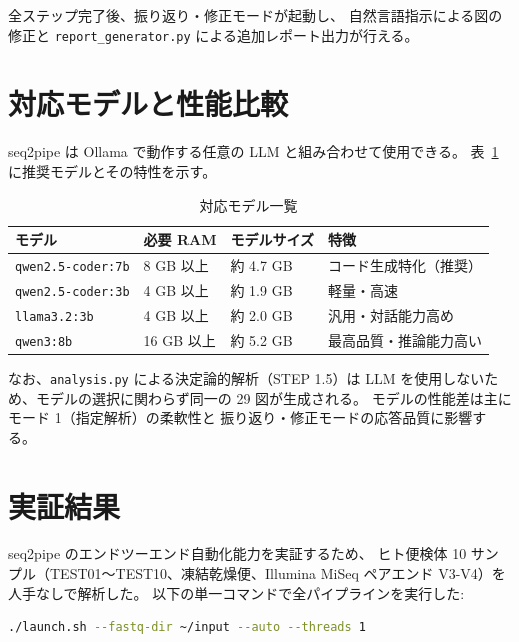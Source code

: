 \documentclass[12pt, a4paper]{article}
\begin{document}
全ステップ完了後、振り返り・修正モードが起動し、
自然言語指示による図の修正と
\texttt{report\_generator.py} による追加レポート出力が行える。

\section{対応モデルと性能比較}

seq2pipe は Ollama で動作する任意の LLM と組み合わせて使用できる。
表~\ref{tab:models} に推奨モデルとその特性を示す。

\begin{table}[h]
  \centering
  \caption{対応モデル一覧}
  \label{tab:models}
  \begin{tabular}{llll}
    \toprule
    \textbf{モデル} & \textbf{必要 RAM} & \textbf{モデルサイズ} & \textbf{特徴} \\
    \midrule
    \texttt{qwen2.5-coder:7b} & 8 GB 以上 & 約 4.7 GB &
      コード生成特化（推奨） \\
    \texttt{qwen2.5-coder:3b} & 4 GB 以上 & 約 1.9 GB &
      軽量・高速 \\
    \texttt{llama3.2:3b}      & 4 GB 以上 & 約 2.0 GB &
      汎用・対話能力高め \\
    \texttt{qwen3:8b}         & 16 GB 以上 & 約 5.2 GB &
      最高品質・推論能力高い \\
    \bottomrule
  \end{tabular}
\end{table}

なお、\texttt{analysis.py} による決定論的解析（STEP 1.5）は
LLM を使用しないため、モデルの選択に関わらず同一の 29 図が生成される。
モデルの性能差は主にモード 1（指定解析）の柔軟性と
振り返り・修正モードの応答品質に影響する。

\section{実証結果}

seq2pipe のエンドツーエンド自動化能力を実証するため、
ヒト便検体 10 サンプル（TEST01〜TEST10、凍結乾燥便、Illumina MiSeq
ペアエンド V3-V4）を人手なしで解析した。
以下の単一コマンドで全パイプラインを実行した:

\begin{lstlisting}[language=bash, caption={seq2pipe による完全自律解析}]
./launch.sh --fastq-dir ~/input --auto --threads 1
\end{lstlisting}
\end{document}
